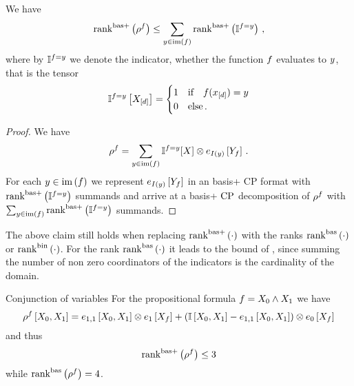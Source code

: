 
\begin{theorem}
    We have
    \[ \mathrm{rank}^{\mathrm{bas+}}\left(\rho^{f}\right) \leq  \sum_{y\in\mathrm{im}\left(f\right)} \mathrm{rank}^{\mathrm{bas+}}\left(\mathbb{I}^{f=y} \right) \, , \]
    where by $\mathbb{I}^{f=y}$ we denote the indicator, whether the function $f$ evaluates to $y$, that is the tensor
    \begin{align*}
        \mathbb{I}^{f=y}\left[X_{[d]}\right] =
        \begin{cases}
            1 & \text{if} \quad f(x_{[d]})=y \\
            0 & \text{else} \, .
        \end{cases}
    \end{align*}
\end{theorem}
\begin{proof}
    We have
    \[ \rho^{f} = \sum_{y\in\mathrm{im}\left(f\right)} \mathbb{I}^{f=y}[X]
    \otimes e_{I(y)}\left[Y_{f}\right] \, . \]
    For each $y\in\mathrm{im}\left(f\right)$ we represent $e_{I(y)}\left[Y_{f}\right]$ in an basis+ CP format with $\mathrm{rank}^{\mathrm{bas+}}\left(\mathbb{I}^{f=y} \right) $ summands and arrive at a basis+ $\mathrm{CP}$ decomposition of $\rho^{f}$ with $\sum_{y\in\mathrm{im}\left(f\right)} \mathrm{rank}^{\mathrm{bas+}}\left(\mathbb{I}^{f=y} \right) $ summands.
\end{proof}

The above claim still holds when replacing $\mathrm{rank}^{\mathrm{bas+}}\left(\cdot\right)$ with the ranks $\mathrm{rank}^{\mathrm{bas}}\left(\cdot\right)$ or $\mathrm{rank}^{\mathrm{bin}}\left(\cdot\right)$.
For the rank $\mathrm{rank}^{\mathrm{bas}}\left(\cdot\right)$ it leads to the bound of , since summing the number of non zero coordinators of the indicators is the cardinality of the domain.

\begin{example}{Conjunction of variables}
    For the propositional formula $f = X_{0} \land X_{1}$ we have
    \[ \rho^{f}\left[X_{0},X_{1}\right]
    = e_{1,1}\left[X_{0},X_{1}\right] \otimes e_{1}\left[X_{f}\right]
    +  (\mathbb{I}\left[X_{0},X_{1}\right] - e_{1,1}\left[X_{0},X_{1}\right]) \otimes e_{0}\left[X_{f}\right]  \]
    and thus
    \[ \mathrm{rank}^{\mathrm{bas+}}\left(\rho^{f}\right) \leq 3\]
    while $\mathrm{rank}^{\mathrm{bas}}\left(\rho^{f}\right) = 4$.
\end{example}




